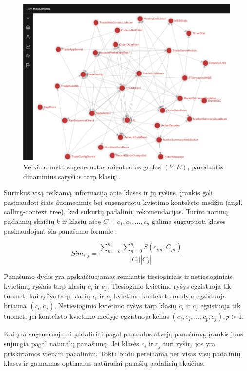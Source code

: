 \documentclass{VUMIFPSbakalaurinis}
\begin{document}
\begin{figure}[H]
    \centering
    \includegraphics{img/mono-micro-grafas.png}
    \caption{Veikimo metu sugeneruotas orientuotas grafas $(V, E)$, parodantis dinaminius sąryšius tarp klasių \cite{KXL+20}.}
    \label{img:mono-micro-grafas}
\end{figure}

Surinkus visą reikiamą informaciją apie klases ir jų ryšius, įrankis gali pasinaudoti šiais duomenimis bei sugeneruotu kvietimo konteksto medžiu (angl. calling-context tree), kad sukurtų padalinių rekomendacijas. Turint norimą padalinių skaičių $k$ ir klasių aibę $C = {c_{1}, c_{2}, ..., c_{n}}$ galima sugrupuoti klases pasinaudojant šia panašumo formule \cite{KXL+20}.

\begin{equation}\label{eq:panasumo-formule}
    Sim_{i,j} = \frac{\sum_{m=o}^{n_{i}}\sum_{n=0}^{n_{j}}S(c_{im},C_{jn})}{\left| C_{i} \right|\left| C_{j} \right|}
\end{equation}

Panašumo dydis yra apskaičiuojamas remiantis tiesioginiais ir netiesioginiais kvietimų ryšiais tarp klasių $c_{i}$ ir $c_{j}$. Tiesioginio kvietimo ryšys egzistuoja tik tuomet, kai ryšys tarp klasių $c_{i}$ ir $c_{j}$ kvietimo konteksto medyje egzistuoja briauna $(c_{i}, c_{j})$. Netiesioginio kvietimo ryšys tarp klasių $c_{i}$ ir $c_{j}$ egzistuoja tik tuomet, jei konteksto kvietimo medyje egzistuoja kelias $(c_{i}, c_{2}, ..., c_{p}, c_{j}), p > 1$.

Kai yra sugeneruojami padaliniai pagal panaudos atvejų panašumą, įrankis juos sujungia pagal natūralų panašumą. Jei klasės $c_{i}$ ir $c_{j}$ turi ryšių, jos yra priskiriamos vienam padaliniui. Tokiu būdu pereinama per visas visų padalinių klases ir gaunamas optimalus natūraliai panašių padalinių skaičius.
\end{document}

